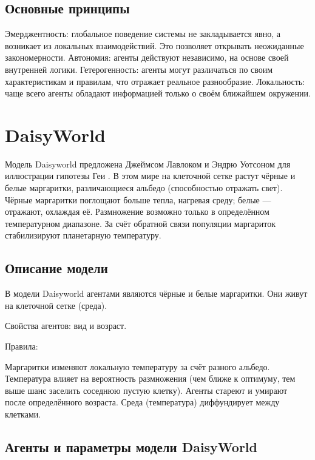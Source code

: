 \documentclass[
  english,
  russian,
  12pt,
  a4paper,
  DIV=11,
  numbers=noendperiod]{scrreprt}
\begin{document}
\subsection{Основные
принципы}\label{ux43eux441ux43dux43eux432ux43dux44bux435-ux43fux440ux438ux43dux446ux438ux43fux44b}

Эмерджентность: глобальное поведение системы не закладывается явно, а
возникает из локальных взаимодействий. Это позволяет открывать
неожиданные закономерности. Автономия: агенты действуют независимо, на
основе своей внутренней логики. Гетерогенность: агенты могут различаться
по своим характеристикам и правилам, что отражает реальное разнообразие.
Локальность: чаще всего агенты обладают информацией только о своём
ближайшем окружении.

\section{DaisyWorld}\label{daisyworld}

Модель Daisyworld предложена Джеймсом Лавлоком и Эндрю Уотсоном для
иллюстрации гипотезы Геи \autocite{watson1983,wood2008}. В этом мире на
клеточной сетке растут чёрные и белые маргаритки, различающиеся альбедо
(способностью отражать свет). Чёрные маргаритки поглощают больше тепла,
нагревая среду; белые --- отражают, охлаждая её. Размножение возможно
только в определённом температурном диапазоне. За счёт обратной связи
популяции маргариток стабилизируют планетарную температуру.

\subsection{Описание
модели}\label{ux43eux43fux438ux441ux430ux43dux438ux435-ux43cux43eux434ux435ux43bux438}

В модели Daisyworld агентами являются чёрные и белые маргаритки. Они
живут на клеточной сетке (среда).

Свойства агентов: вид и возраст.

Правила:

Маргаритки изменяют локальную температуру за счёт разного альбедо.
Температура влияет на вероятность размножения (чем ближе к оптимуму, тем
выше шанс заселить соседнюю пустую клетку). Агенты стареют и умирают
после определённого возраста. Среда (температура) диффундирует между
клетками.

\subsection{Агенты и параметры модели
DaisyWorld}\label{ux430ux433ux435ux43dux442ux44b-ux438-ux43fux430ux440ux430ux43cux435ux442ux440ux44b-ux43cux43eux434ux435ux43bux438-daisyworld}
\end{document}
